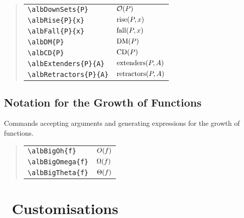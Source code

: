 \documentclass[11pt,a4paper,oneside]{alb-latex}
\begin{document}
\begin{quote}
  \begin{tabular}{p{}@{\qquad}p{}}
    \verb$\albDownSets{P}$ & $\mathcal{O}(P)$ \\
    \verb$\albRise{P}{x}$ & $\operatorname{rise}(P, x)$ \\
    \verb$\albFall{P}{x}$ & $\operatorname{fall}(P, x)$ \\
    \verb$\albDM{P}$ & $\operatorname{DM}(P)$ \\
    \verb$\albCD{P}$ & $\operatorname{CD}(P)$ \\
    \verb$\albExtenders{P}{A}$ & $\operatorname{extenders}(P, A)$ \\
    \verb$\albRetractors{P}{A}$ & $\operatorname{retractors}(P, A)$
  \end{tabular}
\end{quote}



\subsection{Notation for the Growth of Functions}
\label{sec:alb-order-theory-documentation:notat-growth-funct}

Commands accepting arguments and generating expressions for the growth
of functions.

\begin{quote}
  \begin{tabular}{p{}@{\qquad}p{}}
    \verb$\albBigOh{f}$ & $O(f)$ \\
    \verb$\albBigOmega{f}$ & $\Omega(f)$ \\
    \verb$\albBigTheta{f}$ & $\Theta(f)$
  \end{tabular}
\end{quote}




\section{\AUCTeX\ Customisations}
\label{sec:alb-order-theory-documentation:auctex-cust}
\end{document}
